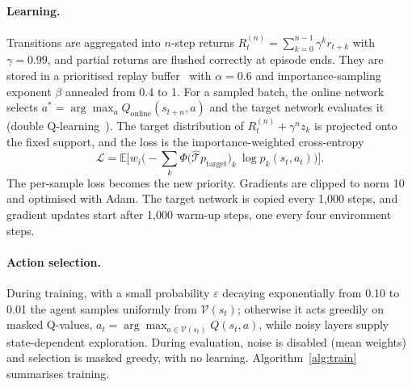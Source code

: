 \paragraph{Learning.} Transitions are aggregated into $n$-step returns $R^{(n)}_t=\sum_{k=0}^{n-1}\gamma^k r_{t+k}$ with $\gamma=0.99$, and partial returns are flushed correctly at episode ends. They are stored in a prioritised replay buffer~\cite{schaul2016per} with $\alpha=0.6$ and importance-sampling exponent $\beta$ annealed from 0.4 to 1. For a sampled batch, the online network selects $a^*=\arg\max_a Q_{\text{online}}(s_{t+n},a)$ and the target network evaluates it (double Q-learning~\cite{vanhasselt2016double}). The target distribution of $R^{(n)}_t+\gamma^n z_k$ is projected onto the fixed support, and the loss is the importance-weighted cross-entropy
\begin{equation}
  \mathcal{L}=\mathbb{E}\Big[w_i\Big(-\sum_k \Phi\big(\hat{\mathcal{T}}p_{\text{target}}\big)_k\ \log p_k(s_t,a_t)\Big)\Big].
\end{equation}
The per-sample loss becomes the new priority. Gradients are clipped to norm 10 and optimised with Adam. The target network is copied every 1,000 steps, and gradient updates start after 1,000 warm-up steps, one every four environment steps.

\paragraph{Action selection.} During training, with a small probability $\varepsilon$ decaying exponentially from 0.10 to 0.01 the agent samples uniformly from $\mathcal{V}(s_t)$; otherwise it acts greedily on masked Q-values, $a_t=\arg\max_{a\in\mathcal{V}(s_t)}Q(s_t,a)$, while noisy layers supply state-dependent exploration. During evaluation, noise is disabled (mean weights) and selection is masked greedy, with no learning. Algorithm~\ref{alg:train} summarises training.

